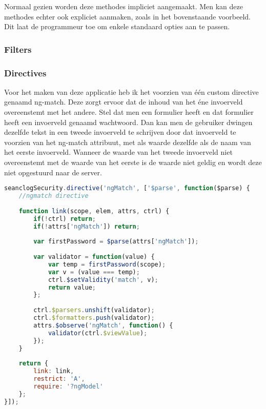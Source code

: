 \documentclass[a4paper,11pt]{article}
\begin{document}
Normaal gezien worden deze methodes impliciet aangemaakt. Men kan deze methodes echter ook expliciet aanmaken, zoals in het bovenstaande voorbeeld. Dit laat de programmeur toe om enkele standaard opties aan te passen.

\subsubsection{Filters}

\subsubsection{Directives}
Voor het maken van deze applicatie heb ik het voorzien van één custom directive genaamd ng-match. Deze zorgt ervoor dat de inhoud van het éne invoerveld overeenstemt met het andere. Stel dat men een formulier heeft en dat formulier heeft een invoerveld genaamd wachtwoord. Dan kan men de gebruiker dwingen dezelfde tekst in een tweede invoerveld te schrijven door dat invoerveld te voorzien van het ng-match attribuut, met als waarde dezelfde als de naam van het eerste invoerveld. Wanneer de waarde van het tweede invoerveld niet overeenstemt met de waarde van het eerste is de waarde niet geldig en wordt deze niet opgestuurd naar de server.

\begin{lstlisting}[language=javascript]
seanclogSecurity.directive('ngMatch', ['$parse', function($parse) {
	//ngmatch directive
	
	function link(scope, elem, attrs, ctrl) {
		if(!ctrl) return;
		if(!attrs['ngMatch']) return;
		
		var firstPassword = $parse(attrs['ngMatch']);
		
		var validator = function(value) {
			var temp = firstPassword(scope);
			var v = (value === temp);
			ctrl.$setValidity('match', v);
			return value;
		};
		
		ctrl.$parsers.unshift(validator);
		ctrl.$formatters.push(validator);
		attrs.$observe('ngMatch', function() {
			validator(ctrl.$viewValue);
		});
	}
	
	return {
		link: link,
		restrict: 'A',
		require: '?ngModel'
	};
}]);
\end{lstlisting}
\end{document}
